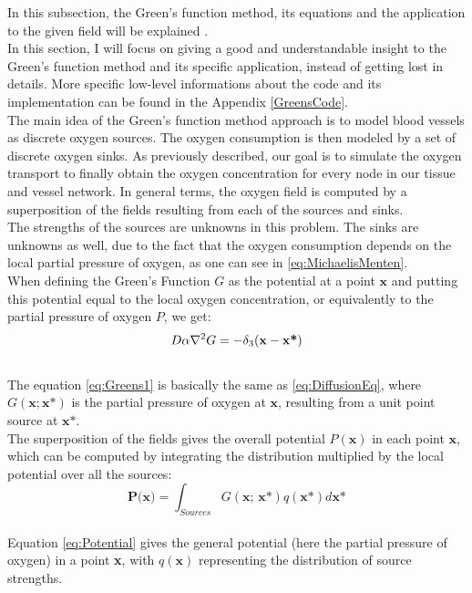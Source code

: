 In this subsection, the Green's function method, its equations and the application to the given field will be explained \cite{secomb1993analysis}.
\\In this section, I will focus on giving a good and understandable insight to the Green's function method and its specific application, instead of getting lost in details. More specific low-level informations about the code and its implementation can be found in the Appendix \ref{GreensCode}.
\\The main idea of the Green's function method approach is to model blood vessels as discrete oxygen sources. The oxygen consumption is then modeled by a set of discrete oxygen sinks. As previously described, our goal is to simulate the oxygen transport to finally obtain the oxygen concentration for every node in our tissue and vessel network. In general terms, the oxygen field is computed by a superposition of the fields resulting from each of the sources and sinks.
\\The strengths of the sources are unknowns in this problem. The sinks are unknowns as well, due to the fact that the oxygen consumption depends on the local partial pressure of oxygen, as one can see in \ref{eq:MichaelisMenten}.
%
\\When defining the Green's Function $G$ as the potential at a point $\textbf{x}$ and putting this potential equal to the local oxygen concentration, or equivalently to the partial pressure of oxygen $P$, we get:
\begin{equation}
\\D\alpha\nabla^2G = - \delta_3 
( \textbf{x} - \textbf{x*} )
\label{eq:Greens1}
\end{equation}
\\The equation \ref{eq:Greens1} is basically the same as \ref{eq:DiffusionEq}, where $G(\textbf{x}; \textbf{x*})$ is the partial pressure of oxygen at $\textbf{x}$, resulting from a unit point source at $\textbf{x*}$.
%
\\The superposition of the fields gives the overall potential $P(\textbf{x})$ in each point $\textbf{x}$, which can be computed by integrating the distribution multiplied by the local potential over all the sources:
\begin{equation}
\textbf{P(x)} = \int_{Sources} G(\textbf{x; x*})q(\textbf{x*})d\textbf{x*}
\label{eq:Potential}
\end{equation}
\\ Equation \ref{eq:Potential} gives the general potential (here the partial pressure of oxygen) in a point \textbf{x}, with $q(\textbf{x})$ representing the distribution of source strengths.
